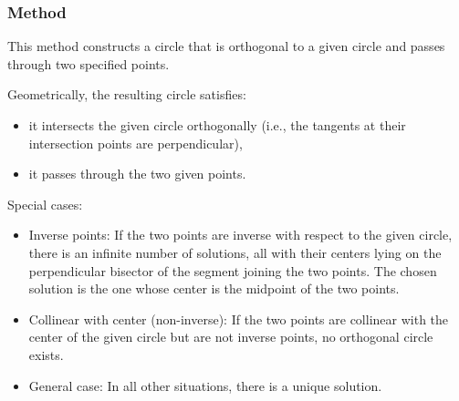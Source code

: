 \subsubsection{Method }
\label{ssub:method_circle_orthogonal_through}

This method constructs a circle that is orthogonal to a given circle and passes through two specified points.

\medskip

Geometrically, the resulting circle satisfies:
\begin{itemize}
\item it intersects the given circle orthogonally (i.e., the tangents at their intersection points are perpendicular),
\item it passes through the two given points.
\end{itemize}

\medskip

Special cases:
\begin{itemize}
\item Inverse points:
If the two points are inverse with respect to the given circle, there is an infinite number of solutions, all with their centers lying on the perpendicular bisector of the segment joining the two points.
The chosen solution is the one whose center is the midpoint of the two points.

\item Collinear with center (non-inverse):
If the two points are collinear with the center of the given circle but are not inverse points, no orthogonal circle exists.

\item General case:
In all other situations, there is a unique solution.
\end{itemize}

\vspace{1em}
\begin{minipage}{.5\textwidth}
\begin{center}
\end{center}
\end{minipage}
\begin{minipage}{.5\textwidth}
\begin{tkzexample}
\end{tkzexample}
\end{minipage}


